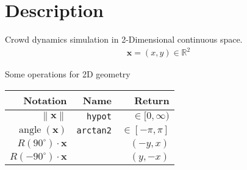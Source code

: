 \section{Description}
Crowd dynamics simulation in 2-Dimensional continuous space.
\begin{align}
\mathbf{x} = (x, y) \in \mathbb{R}^{2}
\end{align}

Some operations for 2D geometry
\begin{table}[H]
\begin{tabularx}{1.0\linewidth}{ R R R }
Notation & Name & Return \\
\hline
\hline
$ \left\| \mathbf{x} \right\| $      & \texttt{hypot} & $ \in [0, \infty) $ \\
$ \operatorname{angle}(\mathbf{x}) $ & \texttt{arctan2} & $ \in [-\pi, \pi] $ \\
$ R(90^{\circ}) \cdot \mathbf{x} $   &  & $ (-y, x) $ \\
$ R(-90^{\circ}) \cdot \mathbf{x} $  &  & $ (y, -x) $ \\
\end{tabularx}
\end{table}


